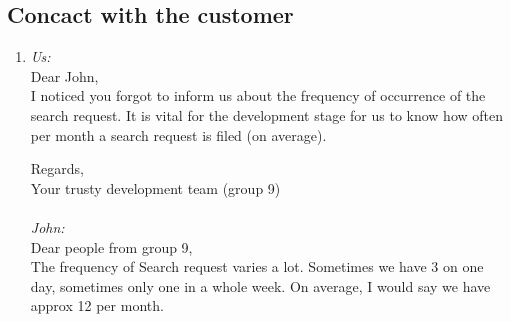 \documentclass{article}
\begin{document}
\subsection*{Concact with the customer}
\begin{enumerate}[1.]
	\item \label{conv1}\textsl{Us:}\\
	Dear John,\\

I noticed you forgot to inform us about the frequency of occurrence of the search request. It is vital for the development stage for us to know how often per month a search request is filed (on average).

Regards,\\
Your trusty development team (group 9)\\
\vspace{10pt}\\
\textsl{John:}\\
Dear people from group 9,\\

The frequency of Search request varies a lot. Sometimes we have 3 on one day, sometimes only one in a whole week. On average, I would say we have approx 12 per month.
\end{enumerate}
\end{document}
